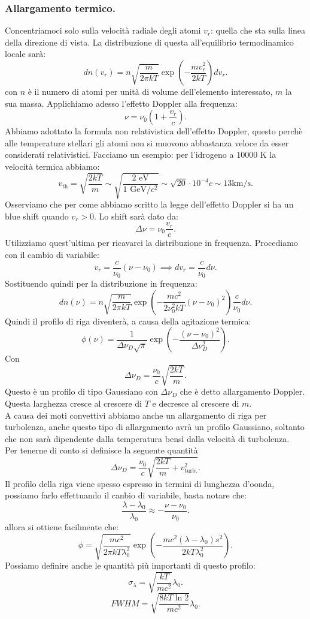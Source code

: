 \subsubsection{Allargamento termico.}
\label{subsubsec:Allargamento termico.}
Concentriamoci solo sulla velocità radiale degli atomi $v_r$: quella che sta sulla linea  della direzione di vista. La distribuzione di questa all'equilibrio termodinamico locale sarà:
\[
	dn( v_{r}) = n\sqrt{\frac{m}{2\pi kT}} 
	\exp\left( -\frac{m v_{r}^2}{2kT} \right) dv_r
.\] 
con $n$ è il numero di atomi per unità di volume dell'elemento interessato, $m$ la sua massa. Applichiamo adesso l'effetto Doppler alla frequenza:
\[
	\nu = \nu_0\left( 1 + \frac{v_r}{c} \right) 
.\] 
Abbiamo adottato la formula non relativistica dell'effetto Doppler, questo perchè alle temperature stellari gli atomi non si muovono abbastanza veloce da esser considerati relativistici. 
Facciamo un esempio: per l'idrogeno a $10000$ K la velocità termica abbiamo:
\[
	v_{\text{th}}
	=
	\sqrt{\frac{2kT}{m}} 
	\sim  \sqrt{\frac{ 2 \text{ eV}}{1 \text{ GeV/}c^2}} 
	\sim \sqrt{20}\cdot 10^{-4}c 
	\sim  13 \text{km}/\text{s}
.\] 
Osserviamo che per come abbiamo scritto la legge dell'effetto Doppler si ha un blue shift quando $v_r > 0$. Lo shift sarà dato da:
\[
	\Delta \nu 
	=
	\nu_0 \frac{v_r}{c}
.\] 
Utilizziamo quest'ultima per ricavarci la distribuzione in frequenza. Procediamo con il cambio di variabile:
\[
	v_r = \frac{c}{\nu_0}\left( \nu - \nu_0  \right) 
	\implies
	dv_r = \frac{c}{\nu_0}d\nu 
.\] 
Sostituendo quindi per la distribuzione in frequenza:
\[
	dn(\nu ) = n \sqrt{\frac{m}{2\pi kT}} \exp\left( - \frac{mc^2}{2\nu_0^2kT}\left( \nu -\nu_0 \right) ^2 \right) \frac{c}{\nu_0}d\nu 
.\] 
Quindi il profilo di riga diventerà, a causa della agitazione termica:
\[
	\phi ( \nu ) = \frac{1}{\Delta \nu_D\sqrt{\pi} }\exp\left( -\frac{\left( \nu -\nu_0 \right) ^2}{\Delta \nu_D^2} \right) 
.\] 
Con 
\[
	\Delta \nu_D = \frac{\nu_0}{c}\sqrt{\frac{2kT}{m}} 
.\] 
Questo è un profilo di tipo Gaussiano con $\Delta \nu _D$ che è detto allargamento Doppler. Questa larghezza cresce al crescere di $T$ e decresce al crescere di $m$.\\
A causa dei moti convettivi abbiamo anche un allargamento di riga per turbolenza, anche questo tipo di allargamento avrà un profilo Gaussiano, soltanto che non sarà dipendente dalla temperatura bensì dalla velocità di turbolenza.\\
Per tenerne di conto si definisce la seguente quantità 
\[
	\Delta \nu_D = \frac{\nu_0}{c}\sqrt{\frac{2kT}{m} + v_\text{turb.}^2} 
.\] 
Il profilo della riga viene spesso espresso in termini di lunghezza d'oonda, possiamo farlo effettuando il canbio di variabile, basta notare che:
\[
	\frac{\lambda - \lambda_0}{\lambda_0} \approx - \frac{\nu - \nu_0}{\nu_0}
.\] 
allora si ottiene facilmente che:
\[
	\phi 
	=
	\sqrt{\frac{mc^2}{2\pi kT\lambda_0^2}} 
	\exp\left( - 
	\frac{mc^2\left( \lambda -\lambda_0 \right)s^2 }{2kT \lambda_0^2} 
	\right) 
.\] 
Possiamo definire anche le quantità più importanti di questo profilo:
\[
	\sigma_\lambda  = \sqrt{\frac{kT}{mc^2}} \lambda_0
.\] 
\[
	FWHM = \sqrt{\frac{8kT \ln 2}{mc^2}} \lambda_0 
.\] 
